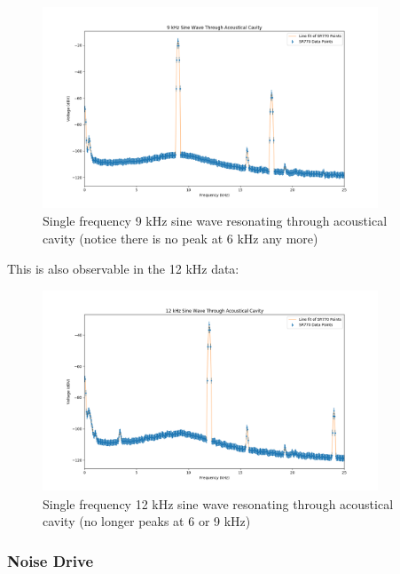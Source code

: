 \documentclass{article}
\begin{document}
\begin{figure}[H]
    \centering
\begin{minipage}{11cm}
\begin{tcolorbox}
    \centering
        \includegraphics[width=10cm, height=6cm]{figures/figure29.png}
        \caption{Single frequency 9 kHz sine wave resonating through acoustical
        cavity (notice there is no peak at 6 kHz any more)}
        \label{fig:fig29}
\end{tcolorbox}
\end{minipage}
\end{figure}

This is also observable in the 12 kHz data:

\begin{figure}[H]
    \centering
\begin{minipage}{11cm}
\begin{tcolorbox}
    \centering
        \includegraphics[width=10cm, height=6cm]{figures/figure30.png}
        \caption{Single frequency 12 kHz sine wave resonating through acoustical
        cavity (no longer peaks at 6 or 9 kHz)}
        \label{fig:fig30}
\end{tcolorbox}
\end{minipage}
\end{figure}

\subsubsection{Noise Drive}%
\label{ssub:noise_drive}
\end{document}
